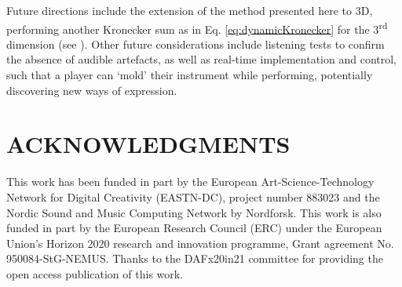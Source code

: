 \documentclass[fleqn]{jaes}
\begin{document}
Future directions include the extension of the method presented here to 3D, performing another Kronecker sum as in Eq. \eqref{eq:dynamicKronecker} for the 3\textsuperscript{rd} dimension (see \cite{Hamilton2016}). Other future considerations include listening tests to confirm the absence of audible artefacts, as well as real-time implementation and control, such that a player can `mold' their instrument while performing, potentially discovering new ways of expression.

\section{ACKNOWLEDGMENTS}
This  work  has  been  funded  in  part  by  the European Art-Science-Technology Network for Digital Creativity (EASTN-DC), project number 883023 and the Nordic Sound and Music Computing Network by Nordforsk. This work is also funded in part by the European Research Council (ERC) under the European Union’s Horizon 2020 research and innovation programme, Grant agreement No. 950084-StG-NEMUS. Thanks to the DAFx20in21 committee for providing the open access publication of this work.




\end{document}
